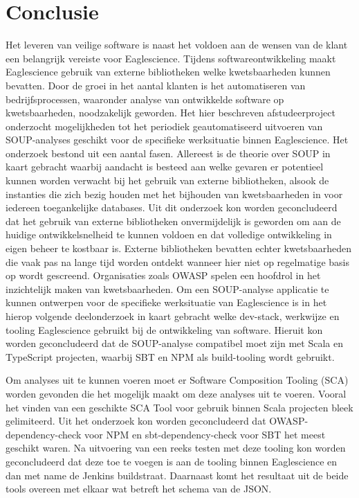 
\chapter{Conclusie}\label{ch:conclusie} %

Het leveren van veilige software is naast het voldoen aan de wensen van de klant een belangrijk vereiste voor Eaglescience. Tijdens softwareontwikkeling maakt Eaglescience gebruik van externe bibliotheken welke kwetsbaarheden kunnen bevatten. Door de groei in het aantal klanten is het automatiseren van bedrijfsprocessen, waaronder analyse van ontwikkelde software op kwetsbaarheden, noodzakelijk geworden. Het hier beschreven afstudeerproject onderzocht mogelijkheden tot het periodiek geautomatiseerd uitvoeren van SOUP-analyses geschikt voor de specifieke werksituatie binnen Eaglescience.
Het onderzoek bestond uit een aantal fasen. Allereest is de theorie over SOUP in kaart gebracht waarbij aandacht is besteed aan welke gevaren er potentieel kunnen worden verwacht bij het gebruik van externe bibliotheken, alsook de instanties die zich bezig houden met het bijhouden van kwetsbaarheden in voor iedereen toegankelijke databases. Uit dit onderzoek kon worden geconcludeerd dat het gebruik van externe bibliotheken onvermijdelijk is geworden om aan de huidige ontwikkelsnelheid te kunnen voldoen en dat volledige ontwikkeling in eigen beheer te kostbaar is. Externe bibliotheken bevatten echter kwetsbaarheden die vaak pas na lange tijd worden ontdekt wanneer hier niet op regelmatige basis op wordt gescreend. Organisaties zoals OWASP spelen een hoofdrol in het inzichtelijk maken van kwetsbaarheden.
Om een SOUP-analyse applicatie te kunnen ontwerpen voor de specifieke werksituatie van Eaglescience is in het hierop volgende deelonderzoek in kaart gebracht welke dev-stack, werkwijze en tooling Eaglescience gebruikt bij de ontwikkeling van software. Hieruit kon worden geconcludeerd dat de SOUP-analyse compatibel moet zijn met Scala en TypeScript projecten, waarbij SBT en NPM als build-tooling wordt gebruikt.

Om analyses uit te kunnen voeren moet er Software Composition Tooling (SCA) worden gevonden die het mogelijk maakt om deze analyses uit te voeren. Vooral het vinden van een geschikte SCA Tool voor gebruik binnen Scala projecten bleek gelimiteerd. Uit het onderzoek kon worden geconcludeerd dat OWASP-dependency-check voor NPM en sbt-dependency-check voor SBT het meest geschikt waren. Na uitvoering van een reeks testen met deze tooling kon worden geconcludeerd dat deze toe te voegen is aan de tooling binnen Eaglescience en dan met name de Jenkins buildstraat. Daarnaast komt het resultaat uit de beide tools overeen met elkaar wat betreft het schema van de JSON.


